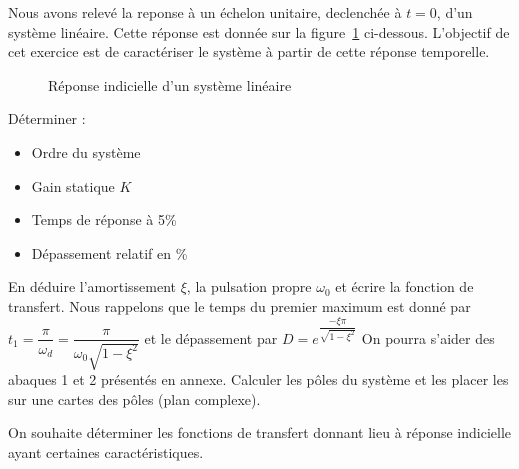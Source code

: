 Nous avons relevé la reponse à un échelon unitaire, 
declenchée à $t=0$, d'un système linéaire.
Cette réponse est donnée sur la figure~\ref{fig-2nd} ci-dessous.
L'objectif de cet exercice est de caractériser le système 
à partir de cette réponse temporelle.
\begin{figure}[!h]
    \centering
    
    \caption{Réponse indicielle d'un système linéaire\label{fig-2nd}}
\end{figure}
\question{}
Déterminer :
\begin{itemize}
    \item Ordre du système
    \item Gain statique $K$
    \item Temps de réponse à 5\%
    \item Dépassement relatif en \%
\end{itemize}
\question{}
En déduire l'amortissement $\xi$, la pulsation propre $\omega_0$ et écrire 
la fonction de transfert. Nous rappelons que le temps du premier maximum est 
donné par $t_1=\dfrac{\pi}{\omega_d}=\dfrac{\pi}{\omega_0\sqrt{1-\xi^2}}$
et le dépassement par $D=e^{\dfrac{-\xi\pi}{\sqrt{1-\xi^2}}}$
On pourra s'aider des abaques 1 et 2 présentés en annexe.
\question{}
Calculer les pôles du système et les placer les sur une cartes des 
pôles (plan complexe).

On souhaite déterminer les fonctions de transfert donnant lieu à réponse 
indicielle ayant certaines caractéristiques.


